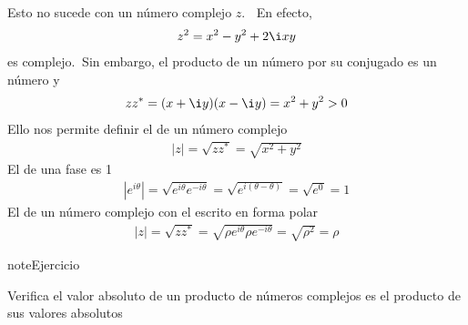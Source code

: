 \documentclass[letterpaper,10pt,english]{jupyterBook}
\begin{document}
\sphinxAtStartPar
Esto no sucede con un número complejo \(z\). \(~\) En efecto,
\begin{equation*}
\begin{split}z^2 = x^2 - y^2 +2\i xy\end{split}
\end{equation*}
\sphinxAtStartPar
es complejo.\(~\) Sin embargo, el producto de un número por su conjugado es un número  y 
\begin{equation*}
\begin{split}
z z^*  = (x + \i y) (x-\i y) = x^2 + y^2 >0
\end{split}
\end{equation*}
\sphinxAtStartPar
Ello nos permite definir el  de un número complejo
\begin{equation*}
\begin{split}
|z| = \sqrt{z z^*} = \sqrt{x^2 + y^2}
\end{split}
\end{equation*}
\sphinxAtStartPar
El  de una fase es 1
\begin{equation*}
\begin{split}
|e^{i\theta}| = \sqrt{ e^{i\theta}   e^{-i\theta}}=\sqrt{ e^{i(\theta-\theta)}}=\sqrt{e^0} = 1
\end{split}
\end{equation*}
\sphinxAtStartPar
El  de un número complejo con el   escrito en forma polar
\begin{equation*}
\begin{split}
|z| = \sqrt{zz^*} = \sqrt{\rho e^{i\theta} \rho e^{-i\theta}}=\sqrt{\rho^2} = \rho
\end{split}
\end{equation*}
\begin{sphinxadmonition}{note}{Ejercicio}

\sphinxAtStartPar
Verifica el valor absoluto de un producto de números complejos es el producto de sus valores absolutos
\end{sphinxadmonition}
\end{document}
